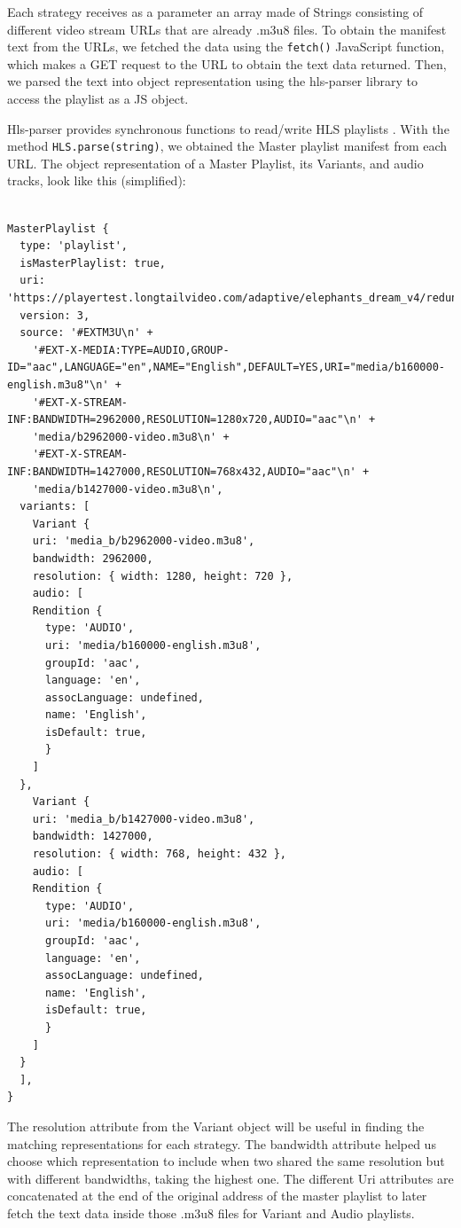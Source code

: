 Each strategy receives as a parameter an array made of Strings consisting of different video stream URLs that are already .m3u8 files. To obtain the manifest text from the URLs, we fetched the data using the \Verb|fetch()| JavaScript function, which makes a GET request to the URL to obtain the text data returned. Then, we parsed the text into object representation using the hls-parser library to access the playlist as a JS object.

Hls-parser provides synchronous functions to read/write HLS playlists \cite{hlsparser}. With the method \Verb|HLS.parse(string)|, we obtained the Master playlist manifest from each URL. The object representation of a Master Playlist, its Variants, and audio tracks, look like this (simplified):

\begin{lstlisting}

MasterPlaylist {
  type: 'playlist',
  isMasterPlaylist: true,
  uri: 'https://playertest.longtailvideo.com/adaptive/elephants_dream_v4/redundant.m3u8',
  version: 3,
  source: '#EXTM3U\n' +
    '#EXT-X-MEDIA:TYPE=AUDIO,GROUP-ID="aac",LANGUAGE="en",NAME="English",DEFAULT=YES,URI="media/b160000-english.m3u8"\n' +
    '#EXT-X-STREAM-INF:BANDWIDTH=2962000,RESOLUTION=1280x720,AUDIO="aac"\n' +
    'media/b2962000-video.m3u8\n' +
    '#EXT-X-STREAM-INF:BANDWIDTH=1427000,RESOLUTION=768x432,AUDIO="aac"\n' +
    'media/b1427000-video.m3u8\n',
  variants: [
    Variant {
    uri: 'media_b/b2962000-video.m3u8',
    bandwidth: 2962000,
    resolution: { width: 1280, height: 720 },
    audio: [ 
    Rendition {
      type: 'AUDIO',
      uri: 'media/b160000-english.m3u8',
      groupId: 'aac',
      language: 'en',
      assocLanguage: undefined,
      name: 'English',
      isDefault: true,
      }
    ]
  },
    Variant {
    uri: 'media_b/b1427000-video.m3u8',
    bandwidth: 1427000,
    resolution: { width: 768, height: 432 },
    audio: [ 
    Rendition {
      type: 'AUDIO',
      uri: 'media/b160000-english.m3u8',
      groupId: 'aac',
      language: 'en',
      assocLanguage: undefined,
      name: 'English',
      isDefault: true,
      }
    ]
  }
  ],
}

\end{lstlisting}

The resolution attribute from the Variant object will be useful in finding the matching representations for each strategy. The bandwidth attribute helped us choose which representation to include when two shared the same resolution but with different bandwidths, taking the highest one. The different Uri attributes are concatenated at the end of the original address of the master playlist to later fetch the text data inside those .m3u8 files for Variant and Audio playlists.

